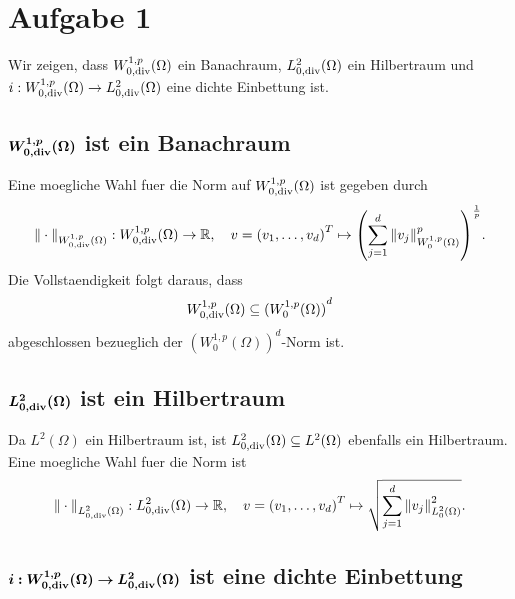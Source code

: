 \documentclass{article}
\begin{document}
\section*{Aufgabe 1}

Wir zeigen, dass $W_{0, \operatorname{div}}^{1,p}(\Omega)$ ein Banachraum, $L_{0, \operatorname{div}}^2(\Omega)$ ein Hilbertraum und $i:W_{0, \operatorname{div}}^{1,p}(\Omega) \rightarrow L_{0, \operatorname{div}}^2(\Omega)$ eine dichte Einbettung ist.

\subsection*{$\bm{W_{0, \operatorname{div}}^{1,p}(\Omega)}$ ist ein Banachraum}

Eine moegliche Wahl fuer die Norm auf $W_{0, \operatorname{div}}^{1,p}(\Omega)$ ist gegeben durch
\begin{equation*}
  {\Vert \cdot \Vert}_{W_{0, \operatorname{div}}^{1,p}(\Omega)} : W_{0, \operatorname{div}}^{1,p}(\Omega) \rightarrow \mathbb{R}, \quad
  v = {(v_1, \dots, v_d)}^T \mapsto {\left( \sum_{j = 1}^{d} {\Vert v_j \Vert}_{W_0^{1,p}(\Omega)}^p \right)}^{\frac{1}{p}}.
\end{equation*}
Die Vollstaendigkeit folgt daraus, dass 
\begin{equation*}
  W_{0, \operatorname{div}}^{1,p}(\Omega) \subseteq {(W_0^{1,p}(\Omega))}^d
\end{equation*}
abgeschlossen bezueglich der ${(W_0^{1,p}(\Omega))}^d$-Norm ist.

\subsection*{$\bm{L_{0, \operatorname{div}}^2(\Omega)}$ ist ein Hilbertraum}

Da $L^2(\Omega)$ ein Hilbertraum ist, ist $L_{0, \operatorname{div}}^2(\Omega) \subseteq L^2(\Omega)$ ebenfalls ein Hilbertraum. Eine moegliche Wahl fuer die Norm ist
\begin{equation*}
  {\Vert \cdot \Vert}_{L_{0, \operatorname{div}}^2(\Omega)} : L_{0, \operatorname{div}}^2(\Omega) \rightarrow \mathbb{R}, \quad
  v = {(v_1, \dots, v_d)}^T \mapsto \sqrt{\sum_{j = 1}^{d} {\Vert v_j \Vert}_{L_0^2(\Omega)}^2}.
\end{equation*}

\subsection*{$\bm{i: W_{0, \operatorname{div}}^{1,p}(\Omega) \rightarrow L_{0, \operatorname{div}}^2(\Omega)}$ ist eine dichte Einbettung}
\end{document}

